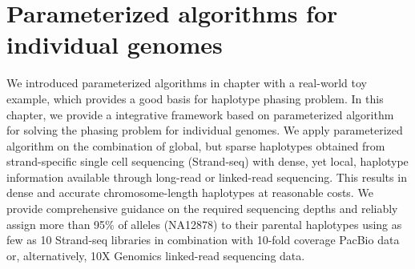 \chapter{Parameterized algorithms for individual genomes}

We introduced parameterized algorithms in chapter with a real-world toy example, which provides a good basis for haplotype phasing problem.
In this chapter, we provide a integrative framework based on parameterized algorithm for solving the phasing problem for individual genomes. 
We apply parameterized algorithm on the combination of global, but sparse haplotypes obtained from strand-specific single cell sequencing (Strand-seq) with dense, yet local, haplotype information available through long-read or linked-read sequencing.
This results in dense and accurate chromosome-length haplotypes at reasonable costs. 
We provide comprehensive guidance on the required sequencing depths and reliably assign more than 95\% of alleles (NA12878) to their parental haplotypes using as few as 10 Strand-seq libraries in combination with 10-fold coverage PacBio data or, alternatively, 10X Genomics linked-read sequencing data.

